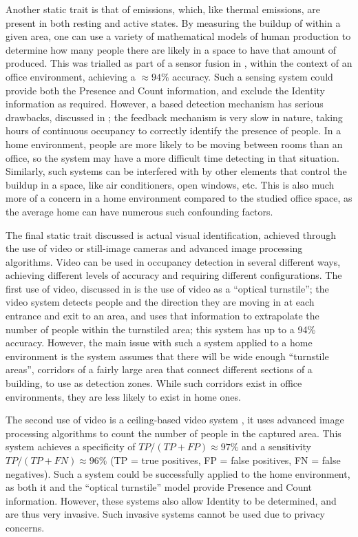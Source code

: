 \documentclass[../thesis/thesis.tex]{subfiles}
\begin{document}
Another static trait is that of \cdi emissions, which, like thermal emissions, are present in both resting and active states. By measuring the buildup of \cdi within a given area, one can use a variety of mathematical models of human \cdi production to determine how many people there are likely in a space to have that amount of \cdi produced. This was trialled as part of a sensor fusion in \cite{hailemariam2011real}, within the context of an office environment, achieving a $\approx94\%$ accuracy. Such a sensing system could provide both the Presence and Count information, and exclude the Identity information as required. However, a \cdi based detection mechanism has serious drawbacks, discussed in \cite{fisk2006accuracy}; the \cdi feedback mechanism is very slow in nature, taking hours of continuous occupancy to correctly identify the presence of people. In a home environment, people are more likely to be moving between rooms than an office, so the system may have a more difficult time detecting in that situation. Similarly, such systems can be interfered with by other elements that control the \cdi buildup in a space, like air conditioners, open windows, etc. This is also much more of a concern in a home environment compared to the studied office space, as the average home can have numerous such confounding factors.

The final static trait discussed is actual visual identification, achieved through the use of video or still-image cameras and advanced image processing algorithms. Video can be used in occupancy detection in several different ways, achieving different levels of accuracy and requiring different configurations. The first use of video, discussed in \cite{erickson2013poem} is the use of video as a ``optical turnstile''; the video system detects people and the direction they are moving in at each entrance and exit to an area, and uses that information to extrapolate the number of people within the turnstiled area; this system has up to a 94\% accuracy. However, the main issue with such a system applied to a home environment is the system assumes that there will be wide enough ``turnstile areas'', corridors of a fairly large area that connect different sections of a building, to use as detection zones. While such corridors exist in office environments, they are less likely to exist in home ones.

The second use of video is a ceiling-based video system \cite{serrano2013efficient}, it uses advanced image processing algorithms to count the number of people in the captured area. This system achieves a specificity of $\mathit{TP}/(\mathit{TP}+\mathit{FP})\approx97\%$ and a sensitivity $\mathit{TP}/(\mathit{TP}+\mathit{FN})\approx96\%$ (TP = true positives, FP = false positives, FN = false negatives). Such a system could be successfully applied to the home environment, as both it and the ``optical turnstile'' model provide Presence and Count information. However, these systems also allow Identity to be determined, and are thus very invasive. Such invasive systems cannot be used due to privacy concerns.
\end{document}
